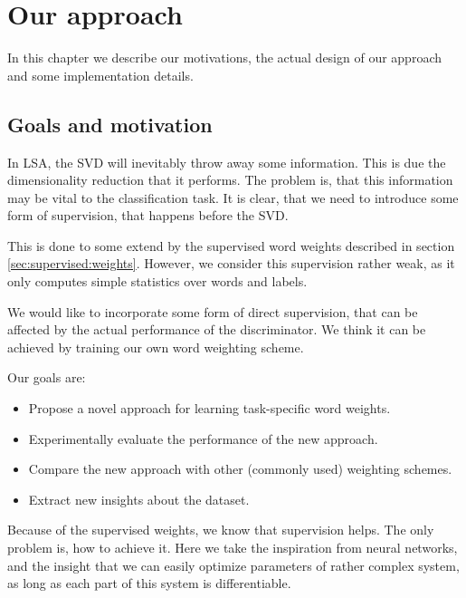 \chapter{Our approach}

In this chapter we describe our motivations, the actual design of our approach and some implementation details.

\section{Goals and motivation}

    \* %
    \* %
    
    In LSA, the SVD will inevitably throw away some information. 
    This is due the dimensionality reduction that it performs.
    The problem is, that this information may be vital to the classification task. 
    It is clear, that we need to introduce some form of supervision, that happens before the SVD.
    
    This is done to some extend by the supervised word weights described in section \ref{sec:supervised:weights}. 
    However, we consider this supervision rather weak, as it only computes simple statistics over words and labels.
    
    We would like to incorporate some form of direct supervision, that can be affected by the actual performance of the discriminator.
    We think it can be achieved by training our own word weighting scheme. 
    
    Our goals are:
    \begin{itemize}
        \item Propose a novel approach for learning task-specific word weights.
        \item Experimentally evaluate the performance of the new approach.
        \item Compare the new approach with other (commonly used) weighting schemes. 
        \item Extract new insights about the dataset.
    \end{itemize}
    
    Because of the supervised weights, we know that supervision helps. 
    The only problem is, how to achieve it. 
    Here we take the inspiration from neural networks, and the insight that we can easily optimize parameters of rather complex system, as long as each part of this system is differentiable. 


